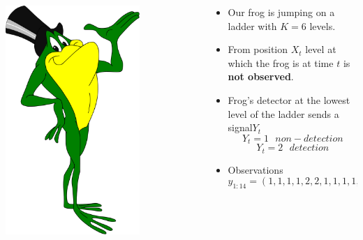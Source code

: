 \documentclass[xcolor=dvipsnames, compress]{beamer}
\begin{document}
\begin{frame}

\begin{columns}
\begin{column}{0.3\textwidth}
	\begin{center}
		\includegraphics[width=0.7\textwidth]{images/frog2.png}
	\end{center}
	
\end{column}
\begin{column}{0.6\textwidth}  %
	
	\begin{itemize}
		\item Our frog is jumping on a ladder with $K=6$ levels.
		\item From position $X_t$ level at which the frog is at time $t$ is \textbf{not observed}.
		\item Frog’s detector at the lowest level of the ladder sends a signal$Y_t$ $$Y_t=1 \mbox{ }non-detection$$ $$Y_t=2 \mbox{ }detection$$
		\item Observations $$y_{1:14} = (1, 1, 1, 1, 2, 2, 1, 1, 1, 1, 2, 2, 1, 2)$$
	\end{itemize}		
	
\end{column}
\end{columns}
\end{frame}
\end{document}
